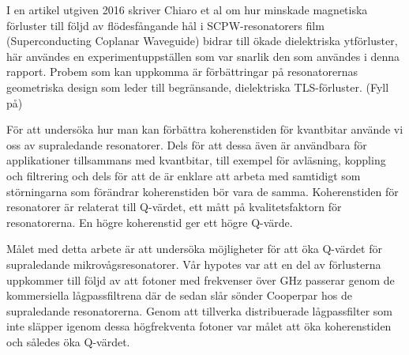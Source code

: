 \documentclass[main.tex]{subfiles}
\begin{document}
I en artikel utgiven 2016 skriver Chiaro et al om hur minskade magnetiska förluster till följd av flödesfångande hål i SCPW-resonatorers film (Superconducting Coplanar Waveguide) bidrar till ökade dielektriska ytförluster, här användes en experimentuppställen som var snarlik den som användes i denna rapport. Probem som kan uppkomma är förbättringar på resonatorernas geometriska design som leder till begränsande, dielektriska TLS-förluster. (Fyll på)


För att undersöka hur man kan förbättra koherenstiden för kvantbitar använde vi oss av supraledande resonatorer. Dels för att dessa även är användbara för applikationer tillsammans med kvantbitar, till exempel för avläsning, koppling och filtrering \cite{placeholder} och dels för att de är enklare att arbeta med samtidigt som störningarna som förändrar koherenstiden bör vara de samma\cite{Oliver2013}. Koherenstiden för resonatorer är relaterat till Q-värdet, ett mått på kvalitetsfaktorn för resonatorerna. En högre koherenstid ger ett högre Q-värde.


Målet med detta arbete är att undersöka möjligheter för att öka Q-värdet för supraledande mikrovågsresonatorer. Vår hypotes var att en del av förlusterna uppkommer till följd av att fotoner med frekvenser över \unit[100]{GHz} passerar genom de kommersiella lågpassfiltrena där de sedan slår sönder Cooperpar hos de supraledande resonatorerna. Genom att tillverka distribuerade lågpassfilter som inte släpper igenom dessa högfrekventa fotoner var målet att öka koherenstiden och således öka Q-värdet.






\end{document}
